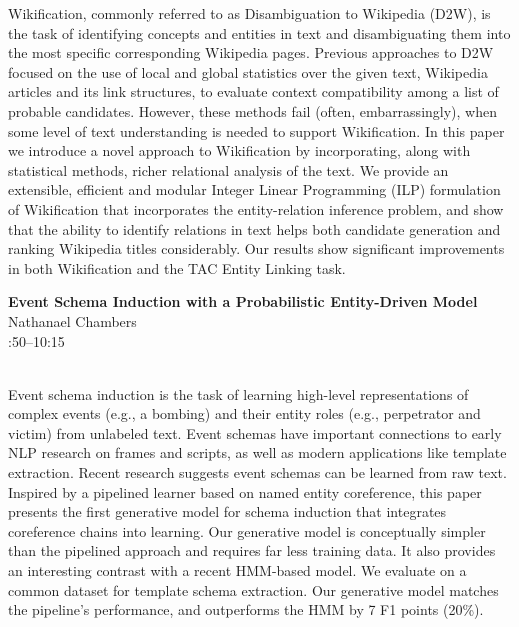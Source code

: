 \documentclass[twoside,makeidx]{book}
\renewcommand{\normalsize}{\fontsize{8}{9}\selectfont}
\renewcommand{\small}{\fontsize{7}{8}\selectfont}
\begin{document}
{\small Wikification, commonly referred to as Disambiguation to Wikipedia (D2W), is the task of identifying concepts and entities in text and disambiguating them into the most specific corresponding Wikipedia pages. Previous approaches to D2W focused on the use of local and global statistics over the given text, Wikipedia articles and its link structures, to evaluate context compatibility among a list of probable candidates. However, these methods fail (often, embarrassingly), when some level of text understanding is needed to support Wikification. In this paper we introduce a novel approach to Wikification by incorporating, along with statistical methods, richer relational analysis of the text. We provide an extensible, efficient and modular Integer Linear Programming (ILP) formulation of Wikification that incorporates the entity-relation inference problem, and show that the ability to identify relations in text helps both candidate generation and ranking Wikipedia titles considerably. Our results show significant improvements in both Wikification and the TAC Entity Linking task.}
\par\vspace{2em}\noindent%
\begin{minipage}{\linewidth}%
\begin{center}
\textbf{\normalsize Event Schema Induction with a Probabilistic Entity-Driven Model}\\
\normalsize  Nathanael Chambers\\
{\small 9:50--10:15}\\
\end{center}
\end{minipage}\\[0.5em]
\nopagebreak%
\noindent%
{\small Event schema induction is the task of learning high-level representations of complex events (e.g., a bombing) and their entity roles (e.g., perpetrator and victim) from unlabeled text. Event schemas have important connections to early NLP research on frames and scripts, as well as modern applications like template extraction. Recent research suggests event schemas can be learned from raw text. Inspired by a pipelined learner based on named entity coreference, this paper presents the first generative model for schema induction that integrates coreference chains into learning. Our generative model is conceptually simpler than the pipelined approach and requires far less training data. It also provides an interesting contrast with a recent HMM-based model. We evaluate on a common dataset for template schema extraction. Our generative model matches the pipeline's performance, and outperforms the HMM by 7 F1 points (20\%).}
\end{document}

